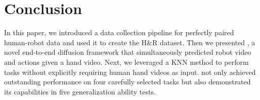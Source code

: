\section{Conclusion}
\label{sec:conclusion}
In this paper, we introduced a data collection pipeline for perfectly paired human-robot data and used it to create the H\&R dataset. Then we presented \system, a novel end-to-end diffusion framework that simultaneously predicted robot video and actions given a hand video. Next, we leveraged a KNN method to perform tasks without explicitly requiring human hand videos as input. \system not only achieved outstanding performance on four carefully selected tasks but also demonstrated its capabilities in five generalization ability tests.
